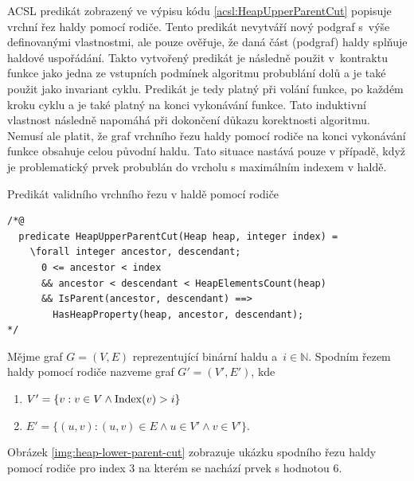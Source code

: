 ACSL predikát zobrazený ve výpisu kódu \ref{acsl:HeapUpperParentCut} popisuje vrchní řez haldy pomocí rodiče. Tento predikát nevytváří nový podgraf s~výše definovanými vlastnostmi, ale pouze ověřuje, že daná část (podgraf) haldy splňuje haldové uspořádání. Takto vytvořený predikát je následně použit v~kontraktu funkce jako jedna ze vstupních podmínek algoritmu probublání dolů a je také použit jako invariant cyklu. Predikát je tedy platný při volání funkce, po každém kroku cyklu a je také platný na konci vykonávání funkce. Tato induktivní vlastnost následně napomáhá při dokončení důkazu korektnosti algoritmu. Nemusí ale platit, že graf vrchního řezu haldy pomocí rodiče na konci vykonávání funkce obsahuje celou původní haldu. Tato situace nastává pouze v případě, když je problematický prvek probublán do vrcholu s maximálním indexem v haldě.

\begin{listing}[H]
	\caption{Predikát validního vrchního řezu v haldě pomocí rodiče}
	\label{acsl:HeapUpperParentCut}
	\begin{verbatim}
/*@
  predicate HeapUpperParentCut(Heap heap, integer index) =
    \forall integer ancestor, descendant;
      0 <= ancestor < index
      && ancestor < descendant < HeapElementsCount(heap)
      && IsParent(ancestor, descendant) ==>
        HasHeapProperty(heap, ancestor, descendant);
*/
	\end{verbatim}
\end{listing}

\begin{definition}
	Mějme graf $G = (V, E)$ reprezentující binární haldu a~$i \in \mathbb{N}$.
	Spodním řezem haldy pomocí rodiče nazveme graf $G' = (V', E')$, kde
	\begin{enumerate}
	  \item[] $V' = \{ v: v \in V \land \operatorname{Index}(v) > i \}$
	  \item[] $E' = \{ (u, v): (u, v) \in E \land u \in V' \land v \in V' \}$.
	\end{enumerate}
\end{definition}

\pagebreak

Obrázek \ref{img:heap-lower-parent-cut} zobrazuje ukázku spodního řezu haldy pomocí rodiče pro index 3 na kterém se nachází prvek s hodnotou 6.

